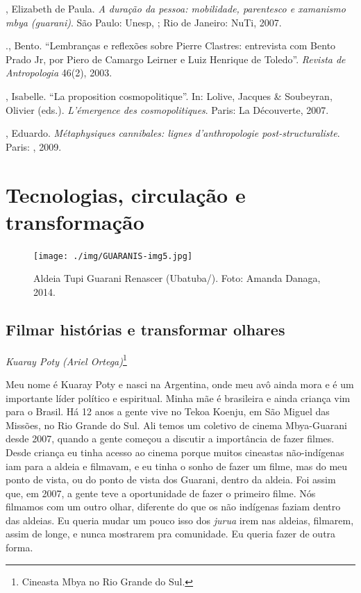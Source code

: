 {{\begin{Parskip}
, Elizabeth de Paula. \emph{A duração da pessoa: mobilidade,
parentesco e xamanismo mbya (guarani)}. São Paulo: Unesp, ; Rio de
Janeiro: NuTi, 2007.

 ., Bento. ``Lembranças e reflexões sobre Pierre Clastres:
entrevista com Bento Prado Jr, por Piero de Camargo Leirner e Luiz
Henrique de Toledo''. \emph{Revista de Antropologia} 46(2), 2003.

, Isabelle. ``La proposition cosmopolitique''. In: Lolive, Jacques
\& Soubeyran, Olivier (eds.). \emph{L’émergence des cosmopolitiques}. Paris:
La Découverte, 2007.

  , Eduardo. \emph{Métaphysiques cannibales: lignes
d’anthropologie post-structuraliste}. Paris: , 2009.
\end{Parskip}

\part{Tecnologias, circulação e transformação}

\begin{figure}
  \centering
 \texttt{[image: ./img/GUARANIS-img5.jpg]}	
  \hfill
  \caption{Aldeia Tupi Guarani Renascer (Ubatuba/). Foto: Amanda Danaga, 2014.}
\end{figure}

 


\chapter{Filmar histórias e transformar olhares}
\begin{flushright}
\emph{Kuaray Poty (Ariel Ortega)}\footnote{Cineasta Mbya no Rio Grande do
Sul.}
\end{flushright}
\medskip

Meu nome é Kuaray Poty e nasci na Argentina, onde meu avô ainda mora e é
um importante líder político e espiritual. Minha mãe é brasileira e
ainda criança vim para o Brasil. Há 12 anos a gente vive no Tekoa
Koenju, em São Miguel das Missões, no Rio Grande do Sul. Ali temos um
coletivo de cinema Mbya-Guarani desde 2007, quando a gente começou a
discutir a importância de fazer filmes. Desde criança eu tinha acesso
ao cinema porque muitos cineastas não-indígenas iam para a aldeia e
filmavam, e eu tinha o sonho de fazer um filme, mas do meu ponto de
vista, ou do ponto de vista dos Guarani, dentro da aldeia. Foi assim
que, em 2007, a gente teve a oportunidade de fazer o primeiro filme.
Nós filmamos com um outro olhar, diferente do que os não indígenas
faziam dentro das aldeias. Eu queria mudar um pouco isso dos \emph{jurua} irem
nas aldeias, filmarem, assim de longe, e nunca mostrarem pra
comunidade. Eu queria fazer de outra forma. 

}}

